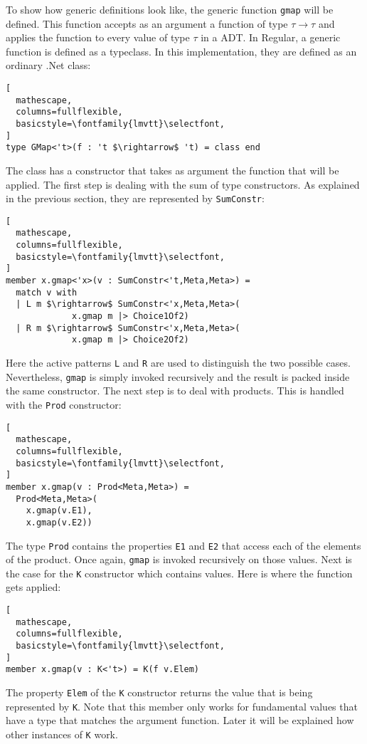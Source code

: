 \documentclass{sigplanconf}
\begin{document}
To show how generic definitions look like, the generic function \verb+gmap+ will be defined. This function accepts as an argument a function of type $\tau\to\tau$ and applies the function to every value of type $\tau$ in a ADT. In Regular, a generic function is defined as a typeclass. In this implementation, they are defined as an ordinary .Net class:
\begin{lstlisting}[
  mathescape,
  columns=fullflexible,
  basicstyle=\fontfamily{lmvtt}\selectfont,
]
type GMap<'t>(f : 't $\rightarrow$ 't) = class end
\end{lstlisting}
The class has a constructor that takes as argument the function that will be applied. The first step is dealing with the sum of type constructors. As explained in the previous section, they are represented by \verb+SumConstr+:
\begin{lstlisting}[
  mathescape,
  columns=fullflexible,
  basicstyle=\fontfamily{lmvtt}\selectfont,
]
member x.gmap<'x>(v : SumConstr<'t,Meta,Meta>) =
  match v with
  | L m $\rightarrow$ SumConstr<'x,Meta,Meta>(
             x.gmap m |> Choice1Of2)
  | R m $\rightarrow$ SumConstr<'x,Meta,Meta>(
             x.gmap m |> Choice2Of2)
\end{lstlisting}
Here the active patterns \verb+L+ and \verb+R+ are used to distinguish the two possible cases. Nevertheless, \verb+gmap+ is simply invoked recursively and the result is packed inside the same constructor. The next step is to deal with products. This is handled with the \verb+Prod+ constructor:
\begin{lstlisting}[
  mathescape,
  columns=fullflexible,
  basicstyle=\fontfamily{lmvtt}\selectfont,
]
member x.gmap(v : Prod<Meta,Meta>) =
  Prod<Meta,Meta>(
    x.gmap(v.E1),
    x.gmap(v.E2))
\end{lstlisting}
The type \verb+Prod+ contains the properties \verb+E1+ and \verb+E2+ that access each of the elements of the product. Once again, \verb+gmap+ is invoked recursively on those values. Next is the case for the \verb+K+ constructor which contains values. Here is where the function gets applied:
\begin{lstlisting}[
  mathescape,
  columns=fullflexible,
  basicstyle=\fontfamily{lmvtt}\selectfont,
]
member x.gmap(v : K<'t>) = K(f v.Elem)
\end{lstlisting}
The property \verb+Elem+ of the \verb+K+ constructor returns the value that is being represented by \verb+K+. Note that this member only works for fundamental values that have a type that matches the argument function. Later it will be explained how other instances of \verb+K+ work.
\end{document}
